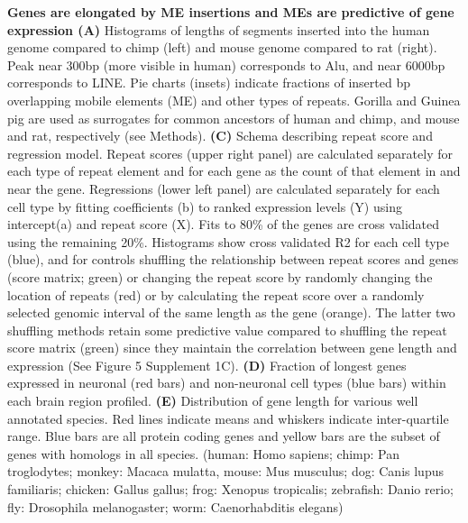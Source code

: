\textbf{Genes are elongated by ME insertions and MEs are predictive of gene expression (A)} Histograms of lengths of segments inserted into the human genome compared to chimp (left) and mouse genome compared to rat (right). Peak near 300bp (more visible in human) corresponds to Alu, and near 6000bp corresponds to LINE. Pie charts (insets) indicate fractions of inserted bp overlapping mobile elements (ME) and other types of repeats. Gorilla and Guinea pig are used as surrogates for common ancestors of human and chimp, and mouse and rat, respectively (see Methods). %
\textbf{(C)} Schema describing repeat score and regression model. Repeat scores (upper right panel) are calculated separately for each type of repeat element and for each gene as the count of that element in and near the gene. Regressions (lower left panel) are calculated separately for each cell type by fitting coefficients (b) to ranked expression levels (Y) using intercept(a) and repeat score (X). Fits to 80\% of the genes are cross validated using the remaining 20\%. Histograms show cross validated R2 for each cell type (blue), and for controls shuffling the relationship between repeat scores and genes (score matrix; green) or changing the repeat score by randomly changing the location of repeats (red) or by calculating the repeat score over a randomly selected genomic interval of the same length as the gene (orange). The latter two shuffling methods retain some predictive value compared to shuffling the repeat score matrix (green) since they maintain the correlation between gene length and expression (See Figure 5 Supplement 1C). \textbf{(D)} Fraction of longest genes expressed in neuronal (red bars) and non-neuronal cell types (blue bars) within each brain region profiled. \textbf{(E)} Distribution of gene length for various well annotated species. Red lines indicate means and whiskers indicate inter-quartile range. Blue bars are all protein coding genes and yellow bars are the subset of genes with homologs in all species. (human: Homo sapiens; chimp: Pan troglodytes; monkey: Macaca mulatta, mouse: Mus musculus; dog: Canis lupus familiaris; chicken: Gallus gallus; frog: Xenopus tropicalis; zebrafish: Danio rerio; fly: Drosophila melanogaster; worm: Caenorhabditis elegans) 